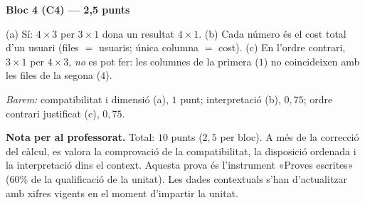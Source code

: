 \begin{solucions}
\textbf{Bloc 4 (C4) — 2,5 punts}
\begin{sollist}
  \item (a) Sí: $4\times 3$ per $3\times 1$ dona un resultat $4\times 1$. \;(b) Cada
        número és el cost total d'un usuari (files $=$ usuaris; única columna $=$
        cost). \;(c) En l'ordre contrari, $3\times 1$ per $4\times 3$, \emph{no} es
        pot fer: les columnes de la primera ($1$) no coincideixen amb les files de
        la segona ($4$).
\end{sollist}
\textit{Barem:} compatibilitat i dimensió (a), $1$ punt; interpretació (b),
$0{,}75$; ordre contrari justificat (c), $0{,}75$.

\medskip
\noindent\textbf{Nota per al professorat.} Total: $10$ punts ($2{,}5$ per bloc). A
més de la correcció del càlcul, es valora la comprovació de la compatibilitat, la
disposició ordenada i la interpretació dins el context. Aquesta prova és
l'instrument «Proves escrites» (60\% de la qualificació de la unitat). Les dades
contextuals s'han d'actualitzar amb xifres vigents en el moment d'impartir la unitat.
\end{solucions}

